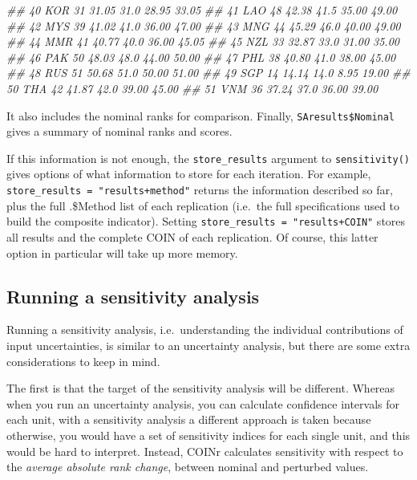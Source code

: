 \documentclass[
]{book}
\newenvironment{Shaded}{\begin{snugshade}}{\end{snugshade}}
\newcommand{\CommentTok}[1]{\textcolor[rgb]{0.56,0.35,0.01}{\textit{#1}}}
\begin{document}
\begin{Shaded}
\begin{Highlighting}[]
\CommentTok{## 40      KOR      31 31.05   31.0 28.95 33.05}
\CommentTok{## 41      LAO      48 42.38   41.5 35.00 49.00}
\CommentTok{## 42      MYS      39 41.02   41.0 36.00 47.00}
\CommentTok{## 43      MNG      44 45.29   46.0 40.00 49.00}
\CommentTok{## 44      MMR      41 40.77   40.0 36.00 45.05}
\CommentTok{## 45      NZL      33 32.87   33.0 31.00 35.00}
\CommentTok{## 46      PAK      50 48.03   48.0 44.00 50.00}
\CommentTok{## 47      PHL      38 40.80   41.0 38.00 45.00}
\CommentTok{## 48      RUS      51 50.68   51.0 50.00 51.00}
\CommentTok{## 49      SGP      14 14.14   14.0  8.95 19.00}
\CommentTok{## 50      THA      42 41.87   42.0 39.00 45.00}
\CommentTok{## 51      VNM      36 37.24   37.0 36.00 39.00}
\end{Highlighting}
\end{Shaded}

It also includes the nominal ranks for comparison. Finally, \texttt{SAresults\$Nominal} gives a summary of nominal ranks and scores.

If this information is not enough, the \texttt{store\_results} argument to \texttt{sensitivity()} gives options of what information to store for each iteration. For example, \texttt{store\_results\ =\ "results+method"} returns the information described so far, plus the full .\$Method list of each replication (i.e.~the full specifications used to build the composite indicator). Setting \texttt{store\_results\ =\ "results+COIN"} stores all results and the complete COIN of each replication. Of course, this latter option in particular will take up more memory.

\hypertarget{running-a-sensitivity-analysis}{%
\subsection{Running a sensitivity analysis}\label{running-a-sensitivity-analysis}}

Running a sensitivity analysis, i.e.~understanding the individual contributions of input uncertainties, is similar to an uncertainty analysis, but there are some extra considerations to keep in mind.

The first is that the target of the sensitivity analysis will be different. Whereas when you run an uncertainty analysis, you can calculate confidence intervals for each unit, with a sensitivity analysis a different approach is taken because otherwise, you would have a set of sensitivity indices for each single unit, and this would be hard to interpret. Instead, COINr calculates sensitivity with respect to the \emph{average absolute rank change}, between nominal and perturbed values.
\end{document}
